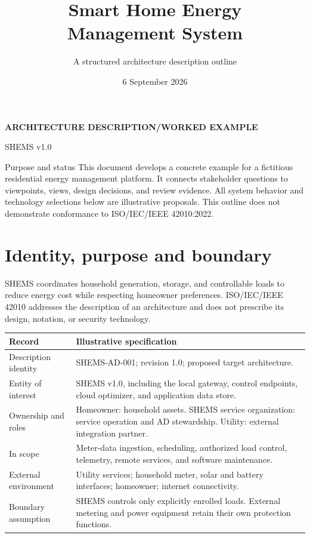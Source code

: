 \documentclass[11pt,letterpaper]{article}
\title{Smart Home Energy\\Management System}
\author{A structured architecture description outline}
\date{6 September 2026}
\makeatletter
\newcommand{\tablehead}[1]{\sffamily\bfseries\color{Navy}#1}
\renewcommand{\maketitle}{%
  {\sffamily\small\bfseries\color{Teal}ARCHITECTURE DESCRIPTION\enspace /\enspace WORKED EXAMPLE\par}
  \vspace{12pt}
  {\sffamily\bfseries\fontsize{29}{33}\selectfont\color{Navy}\@title\par}
  \vspace{9pt}
  {\sffamily\large\color{Muted}\@author\par}
  \vspace{9pt}
  {\sffamily\small\color{Muted}SHEMS v1.0\enspace\textbullet\enspace\@date\par}
  \vspace{12pt}{\color{Teal}\hrule height 1.2pt}\vspace{9pt}}
\makeatother
\begin{document}
\thispagestyle{fancy}
\maketitle

\begin{notebox}{Purpose and status}
This document develops a concrete example for a fictitious residential energy
management platform. It connects stakeholder questions to viewpoints, views,
design decisions, and review evidence. All system behavior and technology
selections below are illustrative proposals. This outline does not demonstrate
conformance to ISO/IEC/IEEE 42010:2022.
\end{notebox}

\section{Identity, purpose and boundary}
SHEMS coordinates household generation, storage, and controllable loads to
reduce energy cost while respecting homeowner preferences. ISO/IEC/IEEE 42010
addresses the description of an architecture and does not prescribe its design,
notation, or security technology.~\cite{iso-catalogue}

{\small
\begin{tabularx}{\linewidth}{@{}L{1.33in}Y@{}}
\toprule
\tablehead{Record} & \tablehead{Illustrative specification}\\
\midrule
Description identity & SHEMS-AD-001; revision 1.0; proposed target architecture.\\
Entity of interest & SHEMS v1.0, including the local gateway, control endpoints,
cloud optimizer, and application data store.\\
Ownership and roles & Homeowner: household assets. SHEMS service organization:
service operation and AD stewardship. Utility: external integration partner.\\
In scope & Meter-data ingestion, scheduling, authorized load control,
telemetry, remote services, and software maintenance.\\
External environment & Utility services; household meter, solar and battery
interfaces; homeowner; internet connectivity.\\
Boundary assumption & SHEMS controls only explicitly enrolled loads. External
metering and power equipment retain their own protection functions.\\
\bottomrule
\end{tabularx}}
\end{document}
